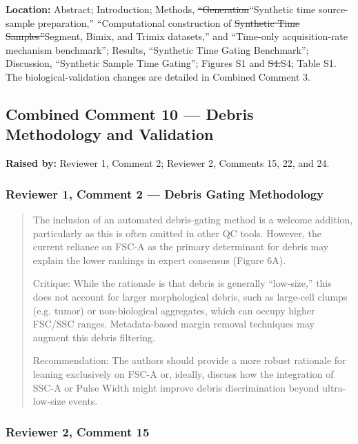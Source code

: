 \documentclass[
  11pt,
  a4paper,
]{article}
\begin{document}
\textbf{Location:} Abstract; Introduction; Methods,
{\color{revisionred}\sout{``Generation}}{\color{revisionblue}``Synthetic
time source-sample preparation,'' ``Computational construction} of
{\color{revisionred}\sout{Synthetic Time
Samples''}}{\color{revisionblue}Segment, Bimix, and Trimix datasets,''}
and ``Time-only acquisition-rate mechanism benchmark''; Results,
``Synthetic Time Gating Benchmark''; Discussion, ``Synthetic Sample Time
Gating''; Figures S1 and
{\color{revisionred}\sout{S4.}}{\color{revisionblue}S4; Table S1.} The
biological-validation changes are detailed in Combined Comment 3.

\subsection{Combined Comment 10 --- Debris Methodology and
Validation}\label{combined-comment-10--debris-methodology-and-validation}

\textbf{Raised by:} Reviewer 1, Comment 2; Reviewer 2, Comments 15, 22,
and 24.

\subsubsection{Reviewer 1, Comment 2 --- Debris Gating
Methodology}\label{reviewer-1-comment-2--debris-gating-methodology}

\begin{quote}
The inclusion of an automated debris-gating method is a welcome
addition, particularly as this is often omitted in other QC tools.
However, the current reliance on FSC-A as the primary determinant for
debris may explain the lower rankings in expert consensus (Figure 6A).

Critique: While the rationale is that debris is generally ``low-size,''
this does not account for larger morphological debris, such as
large-cell clumps (e.g. tumor) or non-biological aggregates, which can
occupy higher FSC/SSC ranges. Metadata-based margin removal techniques
may augment this debris filtering.

Recommendation: The authors should provide a more robust rationale for
leaning exclusively on FSC-A or, ideally, discuss how the integration of
SSC-A or Pulse Width might improve debris discrimination beyond
ultra-low-size events.
\end{quote}

\subsubsection{Reviewer 2, Comment 15}\label{reviewer-2-comment-15}
\end{document}

